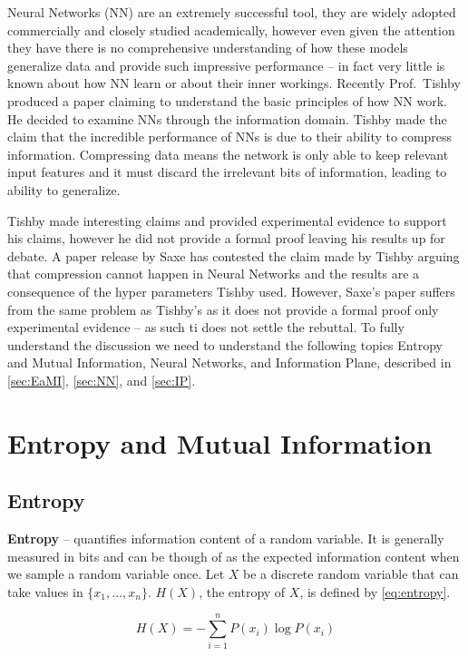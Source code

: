 \documentclass[dissertation.tex]{subfiles}
\begin{document}
Neural Networks (NN) are an extremely successful tool, they are widely adopted
commercially and closely studied academically, however even given the attention
they have there is no comprehensive understanding of how these models generalize
data and provide such impressive performance -- in fact very little is known
about how NN learn or about their inner workings. Recently Prof.\ Tishby
\cite{TISHBY} produced a paper claiming to understand the basic principles of
how NN work. He decided to examine NNs through the information domain. Tishby
made the claim that the incredible performance of NNs is due to their ability to
compress information. Compressing data means the network is only able to keep
relevant input features and it must discard the irrelevant bits of information,
leading to ability to generalize. 

Tishby made interesting claims and provided experimental evidence to support his
claims, however he did not provide a formal proof leaving his results up for
debate. A paper release by Saxe \cite{SAXE} has contested the claim made by
Tishby arguing that compression cannot happen in Neural Networks and the results
are a consequence of the hyper parameters Tishby used. However, Saxe's paper
suffers from the same problem as Tishby's as it does not provide a formal proof
only experimental evidence -- as such ti does not settle the rebuttal.  To fully
understand the discussion we need to understand the following topics Entropy and
Mutual Information, Neural Networks, and Information Plane, described in
\autoref{sec:EaMI}, \autoref{sec:NN}, and \autoref{sec:IP}.

\section{Entropy and Mutual Information}
\label{sec:EaMI}

\subsection{Entropy}
\textbf{Entropy} -- quantifies information content of a random variable. It is
generally measured in bits and can be though of as the expected information
content when we sample a random variable once. Let $X$ be a discrete random
variable that can take values in $\{x_1,...,x_n\}$. $H(X)$, the entropy of
$X$, is defined by \autoref{eq:entropy}.

\begin{equation}
  H(X)=-\sum _{i=1}^{n}{P (x_i)\log P(x_i)}
\label{eq:entropy}
\end{equation}
\end{document}
